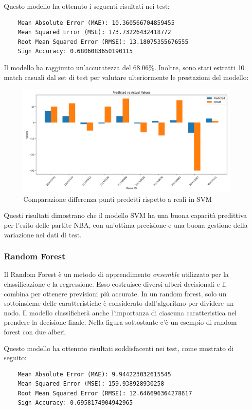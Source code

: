 Questo modello ha ottenuto i seguenti risultati nei test:

\begin{lstlisting}
    Mean Absolute Error (MAE): 10.360566704859455
    Mean Squared Error (MSE): 173.73226432418772
    Root Mean Squared Error (RMSE): 13.18075355676555
    Sign Accuracy: 0.6806083650190115
\end{lstlisting}

Il modello ha raggiunto un'accuratezza del 68.06\%. Inoltre, sono stati estratti 10 match casuali dal set di test per valutare ulteriormente le prestazioni del modello:

\begin{figure}[H]
    \centering
    \includegraphics[width=0.7\linewidth]{img/svm.png}
    \caption{Comparazione differenza punti predetti rispetto a reali in SVM}
    \label{fig:enter-label}
\end{figure}

Questi risultati dimostrano che il modello SVM ha una buona capacità predittiva per l'esito delle partite NBA, con un'ottima precisione e una buona gestione della variazione nei dati di test.

\subsubsection{Random Forest}

Il Random Forest è un metodo di apprendimento \textit{ensemble} utilizzato per la classificazione e la regressione. Esso costruisce diversi alberi decisionali e li combina per ottenere previsioni più accurate. In un random forest, solo un sottoinsieme delle caratteristiche è considerato dall'algoritmo per dividere un nodo. Il modello classificherà anche l'importanza di ciascuna caratteristica nel prendere la decisione finale. Nella figura sottostante c'è un esempio di random forest con due alberi.

Questo modello ha ottenuto risultati soddisfacenti nei test, come mostrato di seguito:

\begin{lstlisting}
    Mean Absolute Error (MAE): 9.944223032615545
    Mean Squared Error (MSE): 159.938928930258
    Root Mean Squared Error (RMSE): 12.646696364278617
    Sign Accuracy: 0.6958174904942965
\end{lstlisting}

